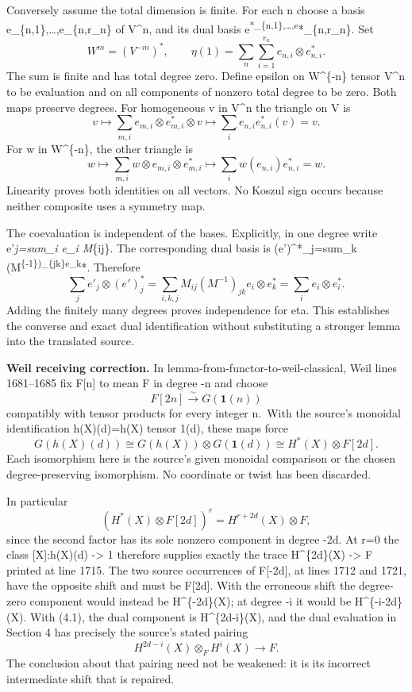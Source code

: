 Conversely assume the total dimension is finite. For each n choose a basis e\_\{n,1\},\ldots,e\_\{n,r\_n\} of V\^{}n, and its dual basis e\textsuperscript{*\_\{n,1\},\ldots,e}*\_\{n,r\_n\}. Set \[
W^m=(V^{-m})^*,\qquad
\eta(1)=\sum_n\sum_{i=1}^{r_n}e_{n,i}\otimes e^*_{n,i}.
\] The sum is finite and has total degree zero. Define epsilon on W\^{}\{-n\} tensor V\^{}n to be evaluation and on all components of nonzero total degree to be zero. Both maps preserve degrees. For homogeneous v in V\^{}n the triangle on V is \[
v\longmapsto
\sum_{m,i}e_{m,i}\otimes e^*_{m,i}\otimes v
\longmapsto
\sum_i e_{n,i}e^*_{n,i}(v)=v.
\] For w in W\^{}\{-n\}, the other triangle is \[
w\longmapsto
\sum_{m,i}w\otimes e_{m,i}\otimes e^*_{m,i}
\longmapsto
\sum_i w(e_{n,i})e^*_{n,i}=w.
\] Linearity proves both identities on all vectors. No Koszul sign occurs because neither composite uses a symmetry map.

The coevaluation is independent of the bases. Explicitly, in one degree write e'\emph{j=sum\_i e\_i M}\{ij\}. The corresponding dual basis is (e')\^{}*\_j=sum\_k (M\textsuperscript{\{-1\})\_\{jk\}e\_k}*. Therefore \[
\sum_j e'_j\otimes(e')^*_j
=\sum_{i,k,j}M_{ij}(M^{-1})_{jk}e_i\otimes e_k^*
=\sum_i e_i\otimes e_i^*.
\] Adding the finitely many degrees proves independence for eta. This establishes the converse and exact dual identification without substituting a stronger lemma into the translated source.

\textbf{Weil receiving correction.} In lemma-from-functor-to-weil-classical, Weil lines 1681--1685 fix F{[}n{]} to mean F in degree -n and choose \[
F[2n]\xrightarrow{\sim}G(\mathbf1(n))
\] compatibly with tensor products for every integer n.~With the source's monoidal identification h(X)(d)=h(X) tensor 1(d), these maps force \[
G(h(X)(d))
\cong G(h(X))\otimes G(\mathbf1(d))
\cong H^*(X)\otimes F[2d].                                \tag{4.1}
\] Each isomorphism here is the source's given monoidal comparison or the chosen degree-preserving isomorphism. No coordinate or twist has been discarded.

In particular \[
(H^*(X)\otimes F[2d])^r
 = H^{r+2d}(X)\otimes F,
\] since the second factor has its sole nonzero component in degree -2d. At r=0 the class {[}X{]}:h(X)(d) -\textgreater{} 1 therefore supplies exactly the trace H\^{}\{2d\}(X) -\textgreater{} F printed at line 1715. The two source occurrences of F{[}-2d{]}, at lines 1712 and 1721, have the opposite shift and must be F{[}2d{]}. With the erroneous shift the degree-zero component would instead be H\^{}\{-2d\}(X); at degree -i it would be H\^{}\{-i-2d\}(X). With (4.1), the dual component is H\^{}\{2d-i\}(X), and the dual evaluation in Section 4 has precisely the source's stated pairing \[
H^{2d-i}(X)\otimes_F H^i(X)\longrightarrow F.
\] The conclusion about that pairing need not be weakened: it is its incorrect intermediate shift that is repaired.

